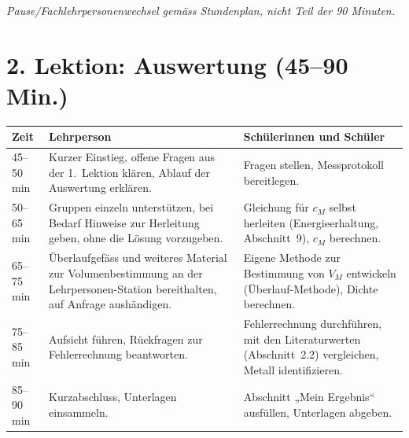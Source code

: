 \documentclass[11pt,a4paper]{article}
\begin{document}
\vspace{4pt}
\noindent\textit{Pause/Fachlehrpersonenwechsel gem\"ass Stundenplan, nicht Teil der 90 Minuten.}

\section{2. Lektion: Auswertung (45--90 Min.)}
\begin{tabularx}{\linewidth}{@{}p{2.0cm} X X@{}}
  \toprule
  \textbf{Zeit} & \textbf{Lehrperson} & \textbf{Sch\"ulerinnen und Sch\"uler} \\
  \midrule
  45--50\,min &
    Kurzer Einstieg, offene Fragen aus der 1.\ Lektion kl\"aren, Ablauf der Auswertung erkl\"aren. &
    Fragen stellen, Messprotokoll bereitlegen. \\
  50--65\,min &
    Gruppen einzeln unterst\"utzen, bei Bedarf Hinweise zur Herleitung geben, ohne die L\"osung vorzugeben. &
    Gleichung f\"ur $c_M$ selbst herleiten (Energieerhaltung, Abschnitt~9), $c_M$ berechnen. \\
  65--75\,min &
    \"Uberlaufgef\"ass und weiteres Material zur Volumenbestimmung an der Lehrpersonen-Station bereithalten, auf Anfrage aush\"andigen. &
    Eigene Methode zur Bestimmung von $V_M$ entwickeln (\"Uberlauf-Methode), Dichte berechnen. \\
  75--85\,min &
    Aufsicht f\"uhren, R\"uckfragen zur Fehlerrechnung beantworten. &
    Fehlerrechnung durchf\"uhren, mit den Literaturwerten (Abschnitt~2.2) vergleichen, Metall identifizieren. \\
  85--90\,min &
    Kurzabschluss, Unterlagen einsammeln. &
    Abschnitt „Mein Ergebnis“ ausf\"ullen, Unterlagen abgeben. \\
  \bottomrule
\end{tabularx}
\end{document}
